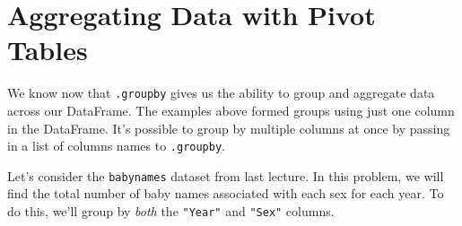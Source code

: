 \documentclass[
  letterpaper,
  DIV=11,
  numbers=noendperiod]{scrreprt}
\begin{document}
\hypertarget{aggregating-data-with-pivot-tables}{%
\section{Aggregating Data with Pivot
Tables}\label{aggregating-data-with-pivot-tables}}

We know now that \texttt{.groupby} gives us the ability to group and
aggregate data across our DataFrame. The examples above formed groups
using just one column in the DataFrame. It's possible to group by
multiple columns at once by passing in a list of columns names to
\texttt{.groupby}.

Let's consider the \texttt{babynames} dataset from last lecture. In this
problem, we will find the total number of baby names associated with
each sex for each year. To do this, we'll group by \emph{both} the
\texttt{"Year"} and \texttt{"Sex"} columns.
\end{document}
